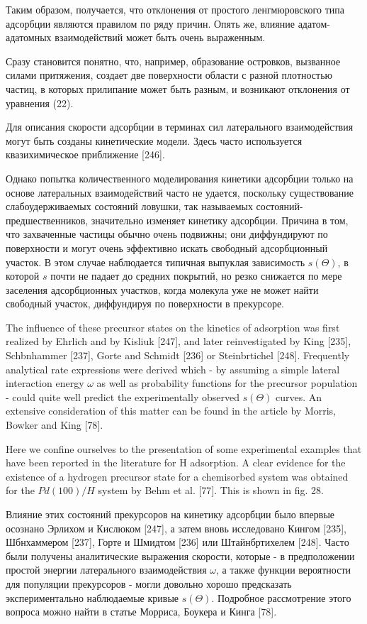 \documentclass[11pt]{article}
\begin{document}
    Таким образом, получается, что отклонения от простого ленгмюровского
типа адсорбции являются правилом по ряду причин. Опять же, влияние
адатом-адатомных взаимодействий может быть очень выраженным.

Сразу становится понятно, что, например, образование островков,
вызванное силами притяжения, создает две поверхности области с разной
плотностью частиц, в которых прилипание может быть разным, и возникают
отклонения от уравнения (22).

Для описания скорости адсорбции в терминах сил латерального
взаимодействия могут быть созданы кинетические модели. Здесь часто
используется квазихимическое приближение {[}246{]}.

Однако попытка количественного моделирования кинетики адсорбции только
на основе латеральных взаимодействий часто не удается, поскольку
существование слабоудерживаемых состояний ловушки, так называемых
состояний-предшественников, значительно изменяет кинетику адсорбции.
Причина в том, что захваченные частицы обычно очень подвижны; они
диффундируют по поверхности и могут очень эффективно искать свободный
адсорбционный участок. В этом случае наблюдается типичная выпуклая
зависимость \(s(\Theta)\), в которой \(s\) почти не падает до средних
покрытий, но резко снижается по мере заселения адсорбционных участков,
когда молекула уже не может найти свободный участок, диффундируя по
поверхности в прекурсоре.

    The influence of these precursor states on the kinetics of adsorption
was first realized by Ehrlich and by Kisliuk {[}247{]}, and later
reinvestigated by King {[}235{]}, Schbnhammer {[}237{]}, Gorte and
Schmidt {[}236{]} or Steinbrtichel {[}248{]}. Frequently analytical rate
expressions were derived which - by assuming a simple lateral
interaction energy \(\omega\) as well as probability functions for the
precursor population - could quite well predict the experimentally
observed \(s(\Theta)\) curves. An extensive consideration of this matter
can be found in the article by Morris, Bowker and King {[}78{]}.

Here we confine ourselves to the presentation of some experimental
examples that have been reported in the literature for H adsorption. A
clear evidence for the existence of a hydrogen precursor state for a
chemisorbed system was obtained for the \(Pd(100)/H\) system by Behm et
al. {[}77{]}. This is shown in fig. 28.

    Влияние этих состояний прекурсоров на кинетику адсорбции было впервые
осознано Эрлихом и Кислюком {[}247{]}, а затем вновь исследовано Кингом
{[}235{]}, Шбнхаммером {[}237{]}, Горте и Шмидтом {[}236{]} или
Штайнбртихелем {[}248{]}. Часто были получены аналитические выражения
скорости, которые - в предположении простой энергии латерального
взаимодействия \(\omega\), а также функции вероятности для популяции
прекурсоров - могли довольно хорошо предсказать экспериментально
наблюдаемые кривые \(s(\Theta)\). Подробное рассмотрение этого вопроса
можно найти в статье Морриса, Боукера и Кинга {[}78{]}.
\end{document}
